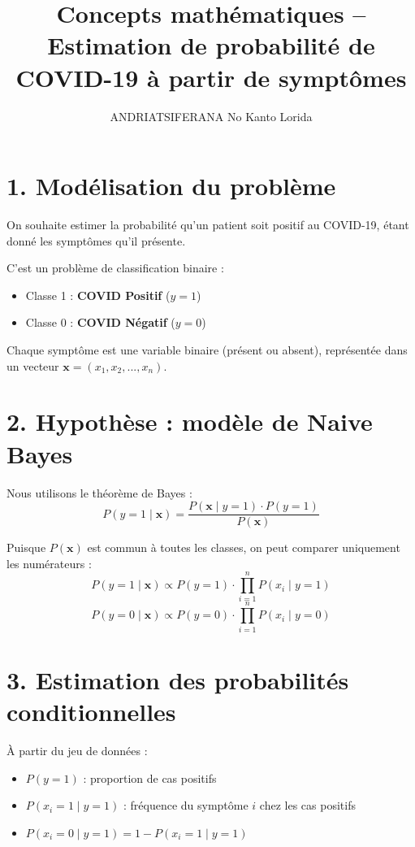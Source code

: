 \documentclass[12pt]{article}
\title{Concepts mathématiques – Estimation de probabilité de COVID-19 à partir de symptômes}
\author{ANDRIATSIFERANA No Kanto Lorida}
\date{}
\begin{document}
\maketitle

\section*{1. Modélisation du problème}

On souhaite estimer la probabilité qu’un patient soit positif au COVID-19, étant donné les symptômes qu’il présente.

C’est un problème de classification binaire :
\begin{itemize}
    \item Classe 1 : \textbf{COVID Positif} ($y = 1$)
    \item Classe 0 : \textbf{COVID Négatif} ($y = 0$)
\end{itemize}

Chaque symptôme est une variable binaire (présent ou absent), représentée dans un vecteur $\mathbf{x} = (x_1, x_2, ..., x_n)$.

\section*{2. Hypothèse : modèle de Naive Bayes}

Nous utilisons le théorème de Bayes :
\[
P(y=1 \mid \mathbf{x}) = \frac{P(\mathbf{x} \mid y=1) \cdot P(y=1)}{P(\mathbf{x})}
\]

Puisque $P(\mathbf{x})$ est commun à toutes les classes, on peut comparer uniquement les numérateurs :
\[
P(y=1 \mid \mathbf{x}) \propto P(y=1) \cdot \prod_{i=1}^n P(x_i \mid y=1)
\]
\[
P(y=0 \mid \mathbf{x}) \propto P(y=0) \cdot \prod_{i=1}^n P(x_i \mid y=0)
\]

\section*{3. Estimation des probabilités conditionnelles}

À partir du jeu de données :
\begin{itemize}
    \item $P(y=1)$ : proportion de cas positifs
    \item $P(x_i=1 \mid y=1)$ : fréquence du symptôme $i$ chez les cas positifs
    \item $P(x_i=0 \mid y=1) = 1 - P(x_i=1 \mid y=1)$
\end{itemize}
\end{document}
